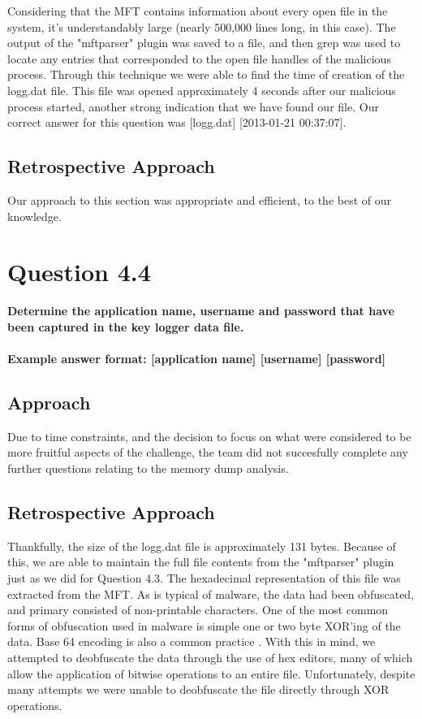 Considering that the MFT contains information about every open file in the system, it's understandably large (nearly 500,000 lines long, in this case). The output of the "mftparser" plugin was saved to a file, and then grep was used to locate any entries that corresponded to the open file handles of the malicious process. Through this technique we were able to find the time of creation of the logg.dat file. This file was opened approximately 4 seconds after our malicious process started, another strong indication that we have found our file. Our correct answer for this question was [logg.dat] [2013-01-21 00:37:07]. 
\subsection{Retrospective Approach}
Our approach to this section was appropriate and efficient, to the best of our knowledge. 
\section{Question 4.4}
\textbf{Determine the application name, username and password that have been
captured in the key logger data file.
\\\\
Example answer format: [application name] [username] [password]}
\subsection{Approach}
Due to time constraints, and the decision to focus on what were considered to be more fruitful aspects of the challenge, the team did not succesfully complete any further questions relating to the memory dump analysis.

\subsection{Retrospective Approach}
Thankfully, the size of the logg.dat file is approximately 131 bytes. Because of this, we are able to maintain the full file contents from the "mftparser" plugin just as we did for Question 4.3. The hexadecimal representation of this file was extracted from the MFT. As is typical of malware, the data had been obfuscated, and primary consisted of non-printable characters. One of the most common forms of obfuscation used in malware is simple one or two byte XOR'ing of the data. Base 64 encoding is also a common practice \cite[441]{pracmal}. With this in mind, we attempted to deobfuscate the data through the use of hex editors, many of which allow the application of bitwise operations to an entire file. Unfortunately, despite many attempts we were unable to deobfuscate the file directly through XOR operations. \\ 

